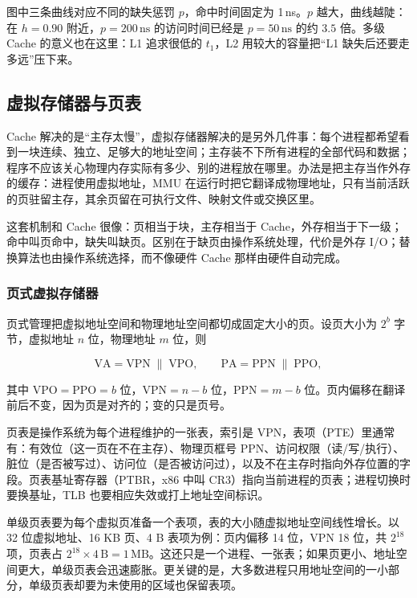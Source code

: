 图中三条曲线对应不同的缺失惩罚 \(p\)，命中时间固定为 1\,ns。\(p\) 越大，曲线越陡：在 \(h=0.90\) 附近，\(p=200\,\mathrm{ns}\) 的访问时间已经是 \(p=50\,\mathrm{ns}\) 的约 \(3.5\) 倍。多级 Cache 的意义也在这里：L1 追求很低的 \(t_1\)，L2 用较大的容量把“L1 缺失后还要走多远”压下来。

\subsection{虚拟存储器与页表}

Cache 解决的是“主存太慢”，虚拟存储器解决的是另外几件事：每个进程都希望看到一块连续、独立、足够大的地址空间；主存装不下所有进程的全部代码和数据；程序不应该关心物理内存实际有多少、别的进程放在哪里。办法是把主存当作外存的缓存：进程使用虚拟地址，MMU 在运行时把它翻译成物理地址，只有当前活跃的页驻留主存，其余页留在可执行文件、映射文件或交换区里。

这套机制和 Cache 很像：页相当于块，主存相当于 Cache，外存相当于下一级；命中叫页命中，缺失叫缺页。区别在于缺页由操作系统处理，代价是外存 I/O；替换算法也由操作系统选择，而不像硬件 Cache 那样由硬件自动完成。

\subsubsection*{页式虚拟存储器}

页式管理把虚拟地址空间和物理地址空间都切成固定大小的页。设页大小为 \(2^b\) 字节，虚拟地址 \(n\) 位，物理地址 \(m\) 位，则

\[
\text{VA}=\text{VPN}\;\|\;\text{VPO},\qquad
\text{PA}=\text{PPN}\;\|\;\text{PPO},
\]

其中 \(\text{VPO}=\text{PPO}=b\) 位，\(\text{VPN}=n-b\) 位，\(\text{PPN}=m-b\) 位。页内偏移在翻译前后不变，因为页是对齐的；变的只是页号。

页表是操作系统为每个进程维护的一张表，索引是 VPN，表项（PTE）里通常有：有效位（这一页在不在主存）、物理页框号 PPN、访问权限（读/写/执行）、脏位（是否被写过）、访问位（是否被访问过），以及不在主存时指向外存位置的字段。页表基址寄存器（PTBR，x86 中叫 CR3）指向当前进程的页表；进程切换时要换基址，TLB 也要相应失效或打上地址空间标识。

单级页表要为每个虚拟页准备一个表项，表的大小随虚拟地址空间线性增长。以 32 位虚拟地址、16 KB 页、4 B 表项为例：页内偏移 14 位，VPN 18 位，共 \(2^{18}\) 项，页表占 \(2^{18}\times4\,\mathrm{B}=1\,\mathrm{MB}\)。这还只是一个进程、一张表；如果页更小、地址空间更大，单级页表会迅速膨胀。更关键的是，大多数进程只用地址空间的一小部分，单级页表却要为未使用的区域也保留表项。

